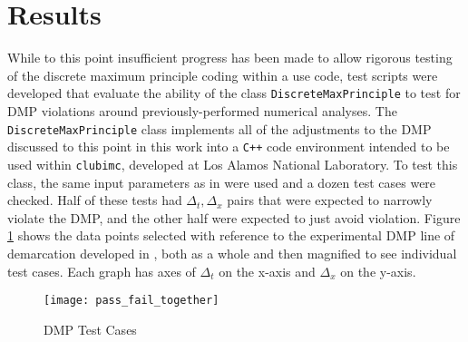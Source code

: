 \section{Results}
While to this point insufficient progress has been made to allow rigorous
testing of the discrete maximum principle coding within a use code, test
scripts were developed that evaluate the ability of the class
\texttt{DiscreteMaxPrinciple} to test for DMP violations around
previously-performed numerical analyses.  The \texttt{DiscreteMaxPrinciple}
class implements all of the adjustments to the DMP discussed to this point in
this work into a \texttt{C++} code environment intended to be used within
\texttt{clubimc}, developed at Los Alamos National Laboratory. To test this
class, the same input parameters as in \cite{WolLarDen} were used and a
dozen
test cases were checked. Half of these tests had $\Delta_t,\Delta_x$ pairs that
were expected to narrowly violate the DMP, and the other half were expected to
just avoid violation. Figure \ref{passfail} shows the data points selected with
reference to the experimental DMP line of demarcation developed in
\cite{WolLarDen}, both as a whole and then magnified to see individual test
cases.  Each graph has axes of $\Delta_t$ on the x-axis and $\Delta_x$ on the
y-axis.
\begin{figure}[htb]
\centering
\texttt{[image: pass\_fail\_together]}
\caption{DMP Test Cases}
\label{passfail}
\end{figure}

